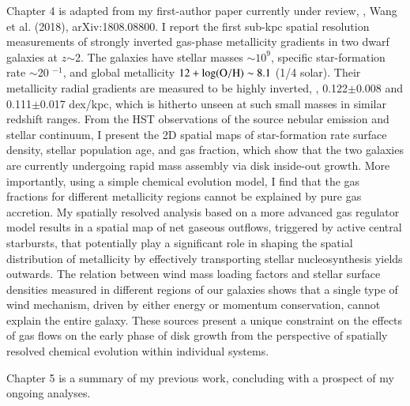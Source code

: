 Chapter 4 is adapted from my first-author paper currently under review, \ie, Wang et al. (2018), arXiv:1808.08800.
I report the first sub-kpc spatial resolution measurements of strongly inverted gas-phase 
metallicity gradients in two dwarf galaxies at $z$$\sim$2.
The galaxies have stellar masses $\sim$$10^9$\Msun, specific star-formation rate $\sim$20 \Gyr$^{-1}$, and 
global metallicity $12+\log({\rm O/H})\sim8.1$ (1/4 solar).
Their metallicity radial gradients are measured to be highly inverted, \ie, 0.122$\pm$0.008 and 
0.111$\pm$0.017 dex/kpc, which is hitherto unseen at such small masses in similar redshift ranges.
From the HST observations of the source nebular emission and stellar continuum, I
present the 2D spatial maps of star-formation rate surface density, stellar population age, and 
gas fraction, which show that the two galaxies are currently undergoing rapid mass assembly via disk 
inside-out growth.  More importantly, using a simple chemical evolution model, I find that the gas 
fractions for different metallicity regions cannot be explained by pure gas accretion.  My spatially 
resolved analysis based on a more advanced gas regulator model results in a spatial map of net gaseous 
outflows, triggered by active central starbursts, that potentially play a significant role in shaping the 
spatial distribution of metallicity by effectively transporting stellar nucleosynthesis yields outwards.  
The relation between wind mass loading factors and stellar surface densities measured in different regions 
of our galaxies shows that a single type of wind mechanism, driven by either energy or momentum 
conservation, cannot explain the entire galaxy.  These sources present a unique constraint on the effects 
of gas flows on the early phase of disk growth from the perspective of spatially resolved chemical 
evolution within individual systems.

Chapter 5 is a summary of my previous work, concluding with a prospect of my ongoing analyses.


